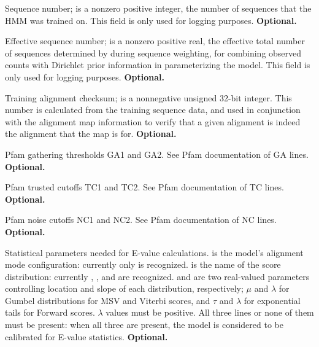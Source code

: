\begin{sreitems}{}
\item [\emprog{NSEQ  <d>}] Sequence number;  is a nonzero
positive integer, the number of sequences that the HMM was trained on.
This field is only used for logging purposes.
\textbf{Optional.}

\item [\emprog{EFFN <f>}] Effective sequence number;  is a
nonzero positive real, the effective total number of sequences
determined by  during sequence weighting, for combining
observed counts with Dirichlet prior information in parameterizing the
model. This field is only used for logging purposes.
\textbf{Optional.}

\item [\emprog{CKSUM <d>}] Training alignment checksum;  is
  a nonnegative unsigned 32-bit integer. This number is calculated
  from the training sequence data, and used in conjunction with the
  alignment map information to verify that a given alignment is indeed
  the alignment that the map is for. \textbf{Optional.}

\item [\emprog{GA    <f> <f>}] Pfam gathering thresholds GA1 and GA2.
See Pfam documentation of GA lines. \textbf{Optional.}

\item [\emprog{TC <f> <f>}] Pfam trusted cutoffs TC1 and TC2.  See
Pfam documentation of TC lines. \textbf{Optional.}

\item [\emprog{NC <f> <f>}] Pfam noise cutoffs NC1 and NC2.  See Pfam
documentation of NC lines. \textbf{Optional.}

\item [\emprog{STATS <s1> <s2> <f1> <f2>}] Statistical parameters
  needed for E-value calculations.  is the model's
  alignment mode configuration: currently only  is
  recognized.  is the name of the score distribution:
  currently , , and  are
  recognized.   and  are two real-valued
  parameters controlling location and slope of each distribution,
  respectively; $\mu$ and $\lambda$ for Gumbel distributions for MSV
  and Viterbi scores, and $\tau$ and $\lambda$ for exponential tails
  for Forward scores.  $\lambda$ values must be positive.  All three
  lines or none of them must be present: when all three are present,
  the model is considered to be calibrated for E-value
  statistics. \textbf{Optional.}


\end{sreitems}
